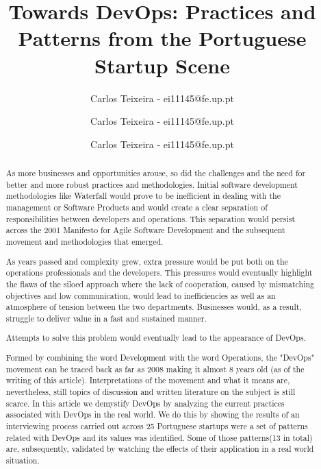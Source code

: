 \documentclass{llncs}
\begin{document}


\title{Towards DevOps: Practices and Patterns from the Portuguese Startup Scene}

\author{Carlos Teixeira - ei11145@fe.up.pt}
\author{Carlos Teixeira - ei11145@fe.up.pt}
\author{Carlos Teixeira - ei11145@fe.up.pt}

%

\maketitle
\begin{abstract}
As more businesses and opportunities arouse, so did the challenges and the need for better and more robust practices and methodologies.
Initial software development methodologies like Waterfall would prove to be inefficient in dealing with the management or Software Products and would create a clear separation of responsibilities between developers and operations.
This separation would persist across the 2001 Manifesto for Agile Software Development and the subsequent movement and methodologies that emerged.

As years passed and complexity grew, extra pressure would be put both on the operations professionals and the developers. This pressures would eventually highlight the flaws of the siloed approach where the lack of cooperation, caused by mismatching objectives and low communication, would lead to inefficiencies as well as an atmosphere of tension between the two departments. Businesses would, as a result, struggle to deliver value in a fast and sustained manner.

Attempts to solve this problem would eventually lead to the appearance of DevOps.

Formed by combining the word Development with the word Operations, the "DevOps" movement can be traced back as far as 2008 making it almost 8 years old (as of the writing of this article).
Interpretations of the movement and what it means are, nevertheless, still topics of discussion and written literature on the subject is still scarce.
In this article we demystify DevOps by analyzing the current practices associated with DevOps in the real world. We do this by showing the results of an interviewing process carried out across 25 Portuguese startups were a set of patterns related with DevOps and its values was identified.
Some of those patterns(13 in total) are, subsequently, validated by watching the effects of their application in a real world situation.

\nocite{Debois2008}

\end{abstract}
\end{document}
